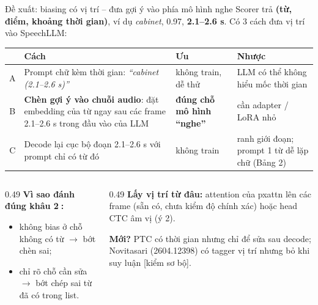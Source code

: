 \documentclass[aspectratio=169,xcolor=table]{beamer}
\newcommand{\hi}[1]{\textcolor{Primary}{\textbf{#1}}}
\newcommand{\src}[1]{{\tiny\color{TextGray}[#1]}}
\newcommand{\ra}{$\rightarrow$}
\begin{document}
\begin{frame}{Đề xuất: biasing có vị trí -- đưa gợi ý vào phía mô hình nghe}
{\small Scorer trả \textbf{(từ, điểm, khoảng thời gian)}, ví dụ \textit{cabinet}, 0.97, \textbf{2.1--2.6 s}. Có 3 cách đưa vị trí vào SpeechLLM:}\par\vspace{0.12cm}
\centering\scriptsize\setlength{\tabcolsep}{3pt}
\begin{tabular}{c p{4.3cm} p{3.6cm} p{3.6cm}}
\toprule
 & Cách & Ưu & Nhược\\
\midrule
A & Prompt chữ kèm thời gian: \textit{``cabinet (2.1--2.6 s)''} & không train, dễ thử & LLM có thể không hiểu mốc thời gian\\
B & \textbf{Chèn gợi ý vào chuỗi audio}: đặt embedding của từ ngay sau các frame 2.1--2.6 s trong đầu vào của LLM & \hi{đúng chỗ mô hình ``nghe''} & cần adapter / LoRA nhỏ\\
C & Decode lại cục bộ đoạn 2.1--2.6 s với prompt chỉ có từ đó & không train & ranh giới đoạn; prompt 1 từ dễ lặp chữ (Bảng 2)\\
\bottomrule
\end{tabular}
\raggedright\vspace{0.2cm}
\begin{columns}[T]
\begin{column}{0.49\textwidth}
\footnotesize\textbf{Vì sao đánh đúng khâu \textcircled{\scriptsize 2}:}
\begin{itemize}\itemsep1pt
\item không bias ở chỗ không có từ \ra{} bớt chèn sai;
\item chỉ rõ chỗ cần sửa \ra{} bớt chép sai từ đã có trong list.
\end{itemize}
\end{column}
\begin{column}{0.49\textwidth}
\footnotesize\textbf{Lấy vị trí từ đâu:} attention của pxattn lên các frame (sẵn có, chưa kiểm độ chính xác) hoặc head CTC âm vị (ý 2).\par
\textbf{Mới?} PTC có thời gian nhưng chỉ để sửa sau decode; Novitasari (2604.12398) có tagger vị trí nhưng bỏ khi suy luận \src{kiểm sơ bộ}.
\end{column}
\end{columns}
\end{frame}
\end{document}
